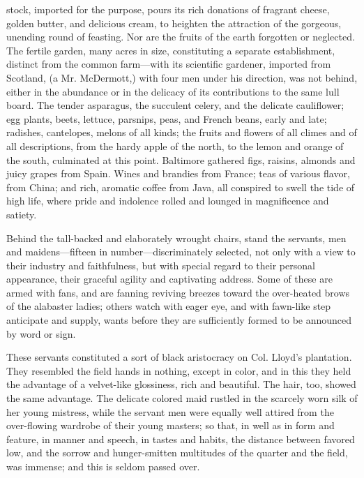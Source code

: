 stock, imported for the purpose, pours its rich donations of fragrant
cheese, golden butter, and delicious cream, to heighten the attraction
of the gorgeous, unending round of feasting. Nor are the fruits of the
earth forgotten or neglected. The fertile garden, many acres in size,
constituting a separate establishment, distinct from the common
farm---with its scientific gardener, imported from Scotland, (a Mr.
McDermott,) with four men under his direction, was not behind, either in
the abundance or in the delicacy of its contributions to the same lull
board. The tender asparagus, the succulent celery, and the delicate
cauliflower; egg plants, beets, lettuce, parsnips, peas, and French
beans, early and late; radishes, cantelopes, melons of all kinds; the
fruits and flowers of all {}climes and of all descriptions, from the
hardy apple of the north, to the lemon and orange of the south,
culminated at this point. Baltimore gathered figs, raisins, almonds and
juicy grapes from Spain. Wines and brandies from France; teas of various
flavor, from China; and rich, aromatic coffee from Java, all conspired
to swell the tide of high life, where pride and indolence rolled and
lounged in magnificence and satiety.

Behind the tall-backed and elaborately wrought chairs, stand the
servants, men and maidens---fifteen in number---discriminately selected,
not only with a view to their industry and faithfulness, but with
special regard to their personal appearance, their graceful agility and
captivating address. Some of these are armed with fans, and are fanning
reviving breezes toward the over-heated brows of the alabaster ladies;
others watch with eager eye, and with fawn-like step anticipate and
supply, wants before they are sufficiently formed to be announced by
word or sign.

These servants constituted a sort of black aristocracy on Col. Lloyd's
plantation. They resembled the field hands in nothing, except in color,
and in this they held the advantage of a velvet-like glossiness, rich
and beautiful. The hair, too, showed the same advantage. The delicate
colored maid rustled in the scarcely worn silk of her young mistress,
while the servant men were equally well attired from the over-flowing
wardrobe of their young masters; so that, in well as in form and
feature, in manner and speech, in tastes and habits, the distance
between favored low, and the sorrow and hunger-smitten {}multitudes of
the quarter and the field, was immense; and this is seldom passed over.

